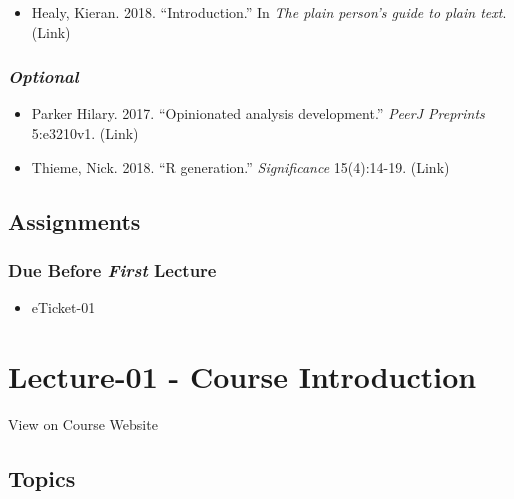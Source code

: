 \documentclass[
]{book}
\providecommand{\tightlist}{%
  \setlength{\itemsep}{0pt}\setlength{\parskip}{0pt}}
\begin{document}
\begin{itemize}
\tightlist
\item
  Healy, Kieran. 2018. ``Introduction.'' In \emph{The plain person's guide to plain text}. (Link)
\end{itemize}

\hypertarget{optional}{%
\subsubsection*{\texorpdfstring{\emph{Optional}}{Optional}}\label{optional}}

\begin{itemize}
\tightlist
\item
  Parker Hilary. 2017. ``Opinionated analysis development.'' \emph{PeerJ Preprints} 5:e3210v1. (Link)
\item
  Thieme, Nick. 2018. ``R generation.'' \emph{Significance} 15(4):14-19. (Link)
\end{itemize}

\hypertarget{assignments-1}{%
\subsection*{Assignments}\label{assignments-1}}

\hypertarget{due-before-first-lecture}{%
\subsubsection*{\texorpdfstring{Due Before \emph{First} Lecture}{Due Before First Lecture}}\label{due-before-first-lecture}}

\begin{itemize}
\tightlist
\item
  eTicket-01
\end{itemize}

\hypertarget{lecture-01---course-introduction}{%
\section*{Lecture-01 - Course Introduction}\label{lecture-01---course-introduction}}

View on Course Website

\hypertarget{topics-1}{%
\subsection*{Topics}\label{topics-1}}
\end{document}
